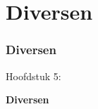 %

\section{Diversen}
\begin{frame}[fragile]
	\frametitle{Diversen}

	\begin{center}\huge{Hoofdstuk 5:}\end{center}
	\begin{center}\huge{\color{typo3darkgrey}\textbf{Diversen}}\end{center}

\end{frame}


